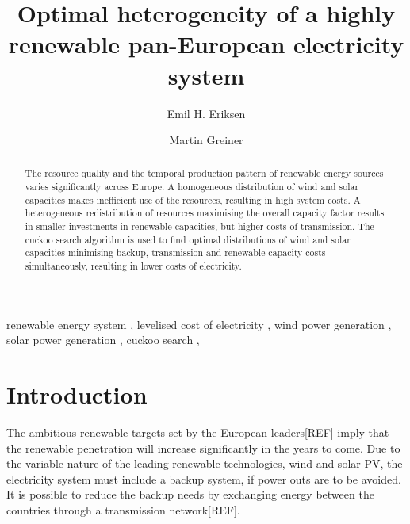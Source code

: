 \documentclass[a4paper, 12pt, sort&compress]{elsarticle}%
\begin{document}
\begin{frontmatter}

\title{Optimal heterogeneity of a highly renewable pan-European electricity system}

\author[label1]{Emil H. Eriksen}
\author[label2,label3]{Martin Greiner}
\address[label1]{Department of Physics and Astronomy, Aarhus University, 8000 Aarhus C,  Denmark}
\address[label2]{Department of Mathematics, Aarhus University, 8000 Aarhus C,  Denmark}
\address[label3]{Department of Engineering, Aarhus University, 8200 Aarhus,  Denmark}


\begin{abstract}
  The resource quality and the temporal production pattern of
  renewable energy sources varies significantly across Europe. A
  homogeneous distribution of wind and solar capacities makes
  inefficient use of the resources, resulting in high system costs. A
  heterogeneous redistribution of resources maximising the overall
  capacity factor results in smaller investments in renewable
  capacities, but higher costs of transmission. The cuckoo search
  algorithm is used to find optimal distributions of wind and solar
  capacities minimising backup, transmission and renewable capacity
  costs simultaneously, resulting in lower costs of electricity.
\end{abstract}

\begin{keyword}
renewable energy system \sep 
levelised cost of electricity \sep
wind power generation \sep
solar power generation \sep
cuckoo search \sep
\end{keyword}

\end{frontmatter}


\section{Introduction}
\label{sec:one}

The ambitious renewable targets set by the European leaders[REF] imply
that the renewable penetration will increase significantly in the
years to come. Due to the variable
nature of the leading renewable technologies, wind and solar PV, the
electricity system must include a backup system, if power outs are to
be avoided. It is possible to reduce the backup needs by exchanging
energy between the countries through a transmission network[REF].
\end{document}

